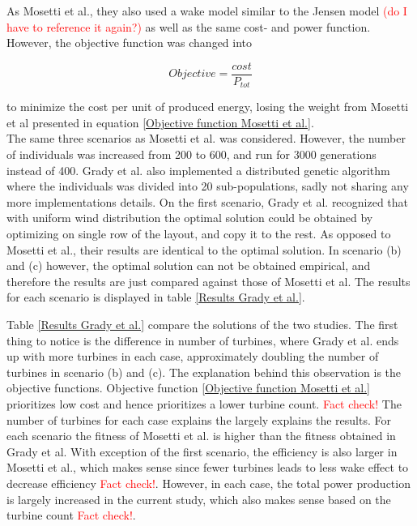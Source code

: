 \noindent As Mosetti et al., they also used a wake model similar to the Jensen model \textcolor{red}{(do I have to reference it again?)} as well as the same cost- and power function. However, the objective function was changed into

\begin{equation}
Objective = \frac{cost}{P_{tot}}
\label{Objective function Grady et al.}
\end{equation}

to minimize the cost per unit of produced energy, losing the weight from Mosetti et al presented in equation \ref{Objective function Mosetti et al.}.\\

\noindent The same three scenarios as Mosetti et al. was considered. However, the number of individuals was increased from 200 to 600, and run for 3000 generations instead of 400. Grady et al. also implemented a distributed genetic algorithm where the individuals was divided into 20 sub-populations, sadly not sharing any more implementations details. On the first scenario, Grady et al. recognized that with uniform wind distribution the optimal solution could be obtained by optimizing on single row of the layout, and copy it to the rest. As opposed to Mosetti et al., their results are identical to the optimal solution. In scenario (b) and (c) however, the optimal solution can not be obtained empirical, and therefore the results are just compared against those of Mosetti et al. The results for each scenario is displayed in table \ref{Results Grady et al.}. 

Table \ref{Results Grady et al.} compare the solutions of the two studies. The first thing to notice is the difference in number of turbines, where Grady et al. ends up with more turbines in each case, approximately doubling the number of turbines in scenario (b) and (c). The explanation behind this observation is the objective functions. Objective function \ref{Objective function Mosetti et al.} prioritizes low cost and hence prioritizes a lower turbine count. \textcolor{red}{Fact check!} The number of turbines for each case explains the largely explains the results. For each scenario the fitness of Mosetti et al. is higher than the fitness obtained in Grady et al. With exception of the first scenario, the efficiency is also larger in Mosetti et al., which makes sense since fewer turbines leads to less wake effect to decrease efficiency \textcolor{red}{Fact check!}. However, in each case, the total power production is largely increased in the current study, which also makes sense based on the turbine count \textcolor{red}{Fact check!}. 


